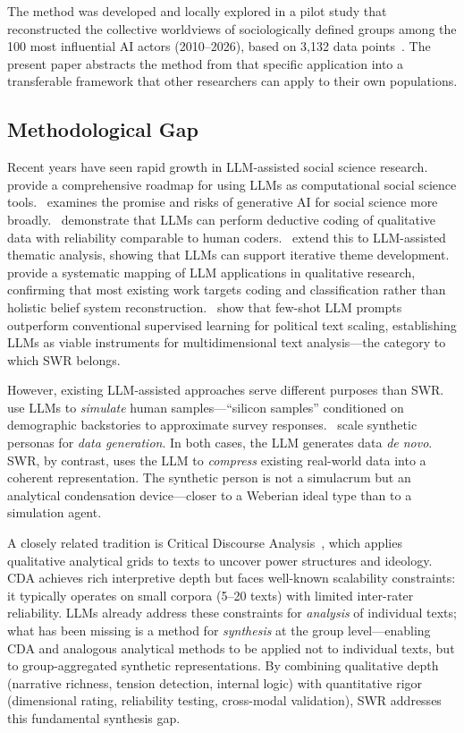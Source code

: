 \documentclass[11pt,a4paper]{article}
\begin{document}
The method was developed and locally explored in a pilot study that reconstructed the collective worldviews of sociologically defined groups among the 100 most influential AI actors (2010--2026), based on 3,132 data points~\citep{Geiger2026PaperA}. The present paper abstracts the method from that specific application into a transferable framework that other researchers can apply to their own populations.


\subsection{Methodological Gap}
\label{sec:intro:gap}

Recent years have seen rapid growth in LLM-assisted social science research.~\citet{Ziems2024} provide a comprehensive roadmap for using LLMs as computational social science tools.~\citet{Bail2024} examines the promise and risks of generative AI for social science more broadly.~\citet{Tai2024} demonstrate that LLMs can perform deductive coding of qualitative data with reliability comparable to human coders.~\citet{Wang2025} extend this to LLM-assisted thematic analysis, showing that LLMs can support iterative theme development.~\citet{Barros2024} provide a systematic mapping of LLM applications in qualitative research, confirming that most existing work targets coding and classification rather than holistic belief system reconstruction.~\citet{Ornstein2025} show that few-shot LLM prompts outperform conventional supervised learning for political text scaling, establishing LLMs as viable instruments for multidimensional text analysis---the category to which SWR belongs.

However, existing LLM-assisted approaches serve different purposes than SWR.~\citet{Argyle2023} use LLMs to \emph{simulate} human samples---``silicon samples'' conditioned on demographic backstories to approximate survey responses.~\citet{Ge2024} scale synthetic personas for \emph{data generation}. In both cases, the LLM generates data \emph{de novo}. SWR, by contrast, uses the LLM to \emph{compress} existing real-world data into a coherent representation. The synthetic person is not a simulacrum but an analytical condensation device---closer to a Weberian ideal type than to a simulation agent.

A closely related tradition is Critical Discourse Analysis~\citep[CDA;][]{Fairclough1992, Wodak2001}, which applies qualitative analytical grids to texts to uncover power structures and ideology. CDA achieves rich interpretive depth but faces well-known scalability constraints: it typically operates on small corpora (5--20 texts) with limited inter-rater reliability. LLMs already address these constraints for \emph{analysis} of individual texts; what has been missing is a method for \emph{synthesis} at the group level---enabling CDA and analogous analytical methods to be applied not to individual texts, but to group-aggregated synthetic representations. By combining qualitative depth (narrative richness, tension detection, internal logic) with quantitative rigor (dimensional rating, reliability testing, cross-modal validation), SWR addresses this fundamental synthesis gap.
\end{document}
